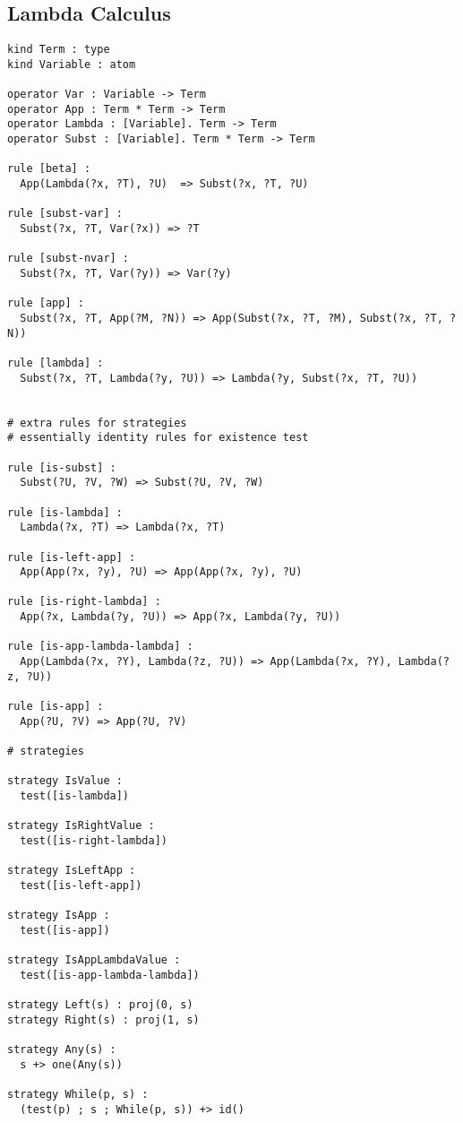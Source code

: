 \documentclass[12pt,a4paper]{article}
\begin{document}
\subsection*{Lambda Calculus}
{\fontsize{8}{8}
\begin{verbatim}
kind Term : type
kind Variable : atom

operator Var : Variable -> Term
operator App : Term * Term -> Term
operator Lambda : [Variable]. Term -> Term
operator Subst : [Variable]. Term * Term -> Term

rule [beta] :
  App(Lambda(?x, ?T), ?U)  => Subst(?x, ?T, ?U)

rule [subst-var] :
  Subst(?x, ?T, Var(?x)) => ?T

rule [subst-nvar] :
  Subst(?x, ?T, Var(?y)) => Var(?y)

rule [app] :
  Subst(?x, ?T, App(?M, ?N)) => App(Subst(?x, ?T, ?M), Subst(?x, ?T, ?N))

rule [lambda] :
  Subst(?x, ?T, Lambda(?y, ?U)) => Lambda(?y, Subst(?x, ?T, ?U))


# extra rules for strategies
# essentially identity rules for existence test

rule [is-subst] :
  Subst(?U, ?V, ?W) => Subst(?U, ?V, ?W)

rule [is-lambda] :
  Lambda(?x, ?T) => Lambda(?x, ?T)

rule [is-left-app] : 
  App(App(?x, ?y), ?U) => App(App(?x, ?y), ?U)

rule [is-right-lambda] :
  App(?x, Lambda(?y, ?U)) => App(?x, Lambda(?y, ?U))

rule [is-app-lambda-lambda] :
  App(Lambda(?x, ?Y), Lambda(?z, ?U)) => App(Lambda(?x, ?Y), Lambda(?z, ?U))

rule [is-app] :
  App(?U, ?V) => App(?U, ?V)

# strategies

strategy IsValue :
  test([is-lambda])

strategy IsRightValue :
  test([is-right-lambda])

strategy IsLeftApp :
  test([is-left-app])

strategy IsApp :
  test([is-app])

strategy IsAppLambdaValue :
  test([is-app-lambda-lambda])

strategy Left(s) : proj(0, s)
strategy Right(s) : proj(1, s)

strategy Any(s) : 
  s +> one(Any(s))

strategy While(p, s) :
  (test(p) ; s ; While(p, s)) +> id()


\end{verbatim}}
\end{document}
